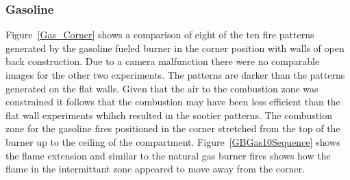 \documentclass[twoside]{uocthesis}
\begin{document}
{\subsubsection{Gasoline}

Figure~\ref{Gas_Corner} shows a comparison of eight of the ten fire patterns generated by the gasoline fueled burner in the corner position with walls of open back construction. Due to a camera malfunction there were no comparable images for the other two experiments.  The patterns are darker than the patterns generated on the flat walls.  Given that the air to the combustion zone was constrained it follows that the combustion may have been less efficient than the flat wall experiments whihch resulted in the sootier patterns.  The combustion zone for the gasoline fires positioned in the corner stretched from the top of the burner up to the ceiling of the compartment.  Figure~\ref{GBGas10Sequence} shows the flame extension and similar to the natural gas burner fires shows how the flame in the intermittant zone appeared to move away from the corner.    

}
\end{document}
